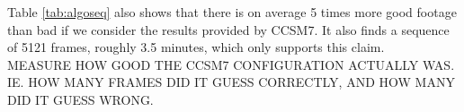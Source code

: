 Table \ref{tab:algoseq} also shows that there is on average 5 times more good footage than bad if we consider the results provided by CCSM7. It also finds a sequence of 5121 frames, roughly 3.5 minutes, which only supports this claim.\\
%
MEASURE HOW GOOD THE CCSM7 CONFIGURATION ACTUALLY WAS. IE. HOW MANY FRAMES DID IT GUESS CORRECTLY, AND HOW MANY DID IT GUESS WRONG.
%
%
